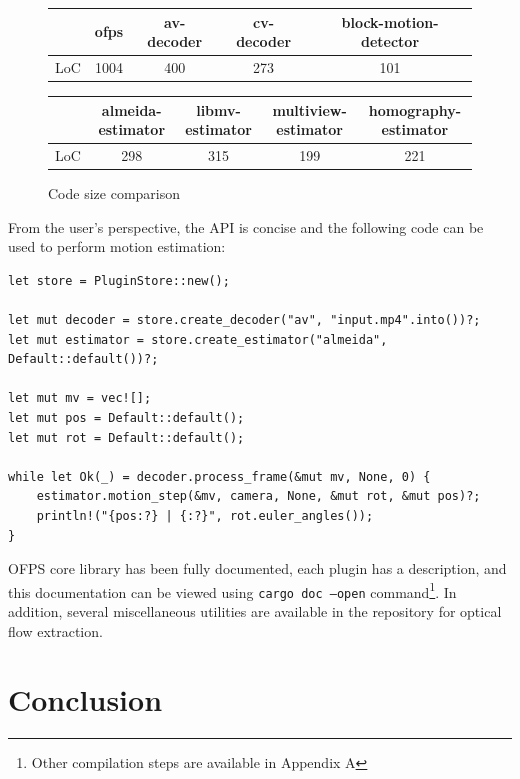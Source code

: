 \documentclass[11pt,english]{report}
\begin{document}
\begin{figure}[!ht]
	\begin{center}
		\begin{tabular}{| c | c | c | c | c |} 
			\hline
			 & ofps & av-decoder & cv-decoder & block-motion-detector \\ [0.5ex] 
			\hline
			LoC & 1004 & 400 & 273 & 101 \\
			\hline
		\end{tabular}

		\space

		\begin{tabular}{| c | c | c | c | c |} 
			\hline
			 & almeida-estimator & libmv-estimator & multiview-estimator & homography-estimator \\ [0.5ex] 
			\hline
			LoC & 298 & 315 & 199 & 221 \\
			\hline
		\end{tabular}
	\end{center}
	\caption{\centering Code size comparison}
\end{figure}

From the user's perspective, the API is concise and the following code can be used to perform motion estimation:

\begin{verbatim}
let store = PluginStore::new();

let mut decoder = store.create_decoder("av", "input.mp4".into())?;
let mut estimator = store.create_estimator("almeida", Default::default())?;

let mut mv = vec![];
let mut pos = Default::default();
let mut rot = Default::default();

while let Ok(_) = decoder.process_frame(&mut mv, None, 0) {
    estimator.motion_step(&mv, camera, None, &mut rot, &mut pos)?;
    println!("{pos:?} | {:?}", rot.euler_angles());
}
\end{verbatim}

OFPS core library has been fully documented, each plugin has a description, and this documentation can be viewed using \texttt{cargo doc --open} command\footnote{Other compilation steps are available in Appendix A}. In addition, several miscellaneous utilities are available in the repository for optical flow extraction.

\chapter{Conclusion}
\end{document}
